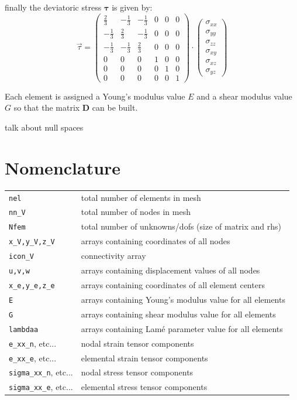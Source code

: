 finally the deviatoric stress ${\bm \tau}$ is given by:
\[
\vec{\tau}=
\left( \begin{array}{cccccc}
\frac23 & - \frac13 & - \frac13 & 0 & 0 & 0 \\
-\frac13 & \frac23 & - \frac13  & 0 & 0 & 0\\
-\frac13& - \frac13 & \frac23  & 0 & 0 & 0\\
0&0&0& 1&0 &0  \\
0&0&0&0&1 &0\\
0&0&0&0&0& 1
\end{array} \right)
\cdot
\left( \begin{array}{c}
\sigma_{xx}\\
\sigma_{yy}\\
\sigma_{zz}\\
\sigma_{xy}\\
\sigma_{xz}\\
\sigma_{yz}
\end{array} \right)
\]


Each element is assigned a Young's modulus value $E$ and a 
shear modulus value $G$ so that the matrix ${\bm D}$ can be built.

{\color{red} talk about null spaces}


\section*{Nomenclature}

\begin{tabular}{ll}
\lstinline|nel| & total number of elements in mesh \\
\lstinline|nn_V| & total number of nodes in mesh \\
\lstinline|Nfem| & total number of unknowns/dofs (size of matrix and rhs) \\
\lstinline|x_V,y_V,z_V| & arrays containing coordinates of all nodes \\
\lstinline|icon_V| & connectivity array \\
\lstinline|u,v,w| & arrays containing displacement values of all nodes \\
\lstinline|x_e,y_e,z_e| & arrays containing coordinates of all element centers \\
\lstinline|E| & arrays containing Young's modulus value for all elements \\
\lstinline|G| & arrays containing shear modulus value for all elements \\
\lstinline|lambdaa| & arrays containing Lam\'e parameter value for all elements \\
\lstinline|e_xx_n|, etc... & nodal strain tensor components  \\
\lstinline|e_xx_e|, etc... & elemental strain tensor components \\
\lstinline|sigma_xx_n|, etc... & nodal stress tensor components  \\
\lstinline|sigma_xx_e|, etc... & elemental stress tensor components \\
\end{tabular}




